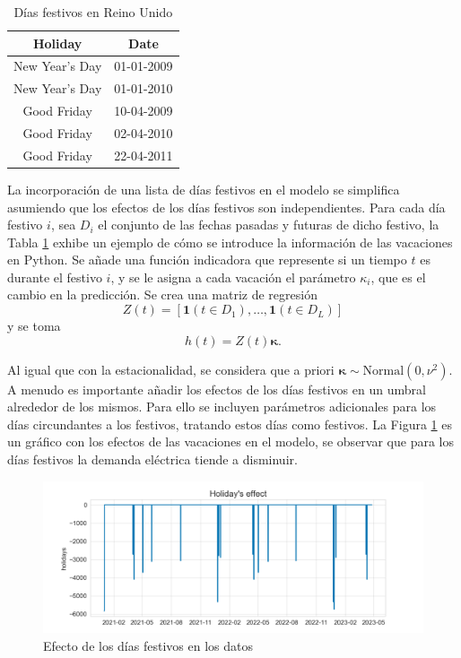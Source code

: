 \documentclass[12pt,twoside]{article}
\begin{document}
\begin{table}[h] 
\centering
\begin{tabular}{cc} \hline
Holiday & Date \\\hline
New Year's Day & 01-01-2009\\
New Year's Day & 01-01-2010\\
Good Friday & 10-04-2009 \\
Good Friday & 02-04-2010 \\
Good Friday & 22-04-2011 \\ \hline

\end{tabular}
\caption{Días festivos en Reino Unido} \label{tab:festivos}
\end{table}
La incorporación de una lista de días festivos en el modelo se simplifica asumiendo que los efectos de los días festivos son independientes. Para cada día festivo $i$, sea $D_i$ el conjunto de las fechas pasadas y futuras de dicho festivo, la Tabla \ref{tab:festivos} exhibe un ejemplo de cómo se introduce la información de las vacaciones en Python. Se añade una función indicadora que represente si un tiempo $t$ es durante el festivo $i$, y se le asigna a cada vacación el parámetro $\kappa_i$, que es el cambio en la predicción. Se crea una matriz de regresión
\begin{equation*}
    Z(t) = [\mathbf{1}(t\in D_1), \dotsc, \mathbf{1}(t\in D_L)]
\end{equation*}
y se toma 
\begin{equation}\label{eq:prophet:h}
    h(t) = Z(t) \boldsymbol{\kappa}.
    \end{equation}

Al igual que con la estacionalidad, se considera que a priori $\boldsymbol{\kappa} \sim \text{Normal}(0, \nu^2)$. A menudo es importante añadir los efectos de los días festivos en un umbral alrededor de los mismos. Para ello se incluyen parámetros adicionales para los días circundantes a los festivos, tratando estos días como festivos. La Figura \ref{fig:prophet_hday} es un gráfico con los efectos de las vacaciones en el modelo, se observar que para los días festivos la demanda eléctrica tiende a disminuir.




\begin{center}
\begin{figure}[h]
    \includegraphics[width = \textwidth]{imagenes/prophet_hday.png}
    \caption{Efecto de los días festivos en los datos}\label{fig:prophet_hday}
\end{figure}
\end{center}
\end{document}

